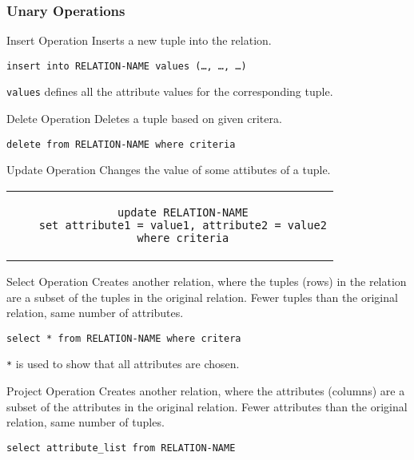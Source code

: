 \documentclass[\main/notes.tex]{subfiles}
\begin{document}
				\subsubsection{Unary Operations}
					\begin{definition}{Insert Operation}
						Inserts a new tuple into the relation.
						\begin{center}
							\texttt{insert into RELATION-NAME values (\ldots, \ldots, \ldots)}
						\end{center}
						\texttt{values} defines all the attribute values for the corresponding tuple.
					\end{definition}
					\begin{definition}{Delete Operation}
						Deletes a tuple based on given critera.
						\begin{center}
							\texttt{delete from RELATION-NAME where criteria}
						\end{center}
					\end{definition}
					\begin{definition}{Update Operation}
						Changes the value of some attibutes of a tuple.
						\begin{center}
							\begin{tabular}{c}
								\begin{lstlisting}
	update RELATION-NAME
	set attribute1 = value1, attribute2 = value2
	where criteria
								\end{lstlisting}
							\end{tabular}
						\end{center}
					\end{definition}
					\begin{definition}{Select Operation}
						Creates another relation, where the tuples (rows) in the relation are a subset of the tuples in the original relation. Fewer tuples than the original relation, same number of attributes.
						\begin{center}
							\texttt{select * from RELATION-NAME where critera}
						\end{center}
						\texttt{*} is used to show that all attributes are chosen.
					\end{definition}
					\begin{definition}{Project Operation}
						Creates another relation, where the attributes (columns) are a subset of the attributes in the original relation. Fewer attributes than the original relation, same number of tuples.
						\begin{center}
							\texttt{select attribute\_list from RELATION-NAME}
						\end{center}
					\end{definition}
\end{document}
